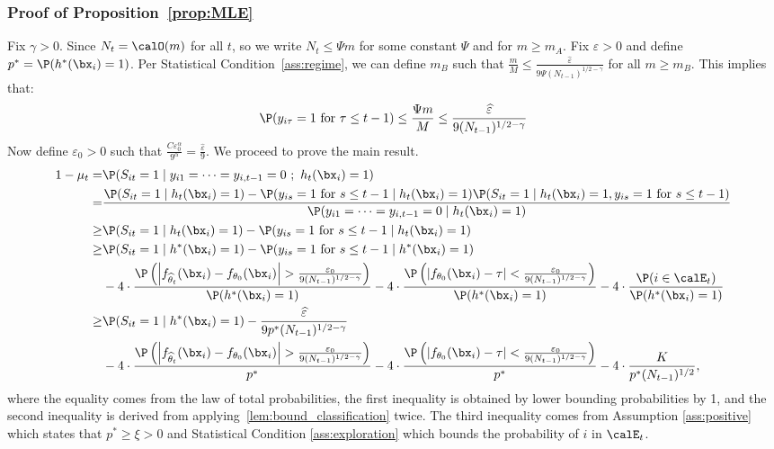\documentclass[blindrev]{informs3noheader}
\begin{document}
\subsubsection*{Proof of Proposition~\ref{prop:MLE}}
Fix $\gamma>0$. Since $N_t=\calO(m)$ for all $t$, so we write $N_t\leq \Psi m$ for some constant $\Psi$ and for $m\geq m_A$. Fix $\widehat\varepsilon>0$ and define $p^*= \P(h^*(\bx_i)=1)$. Per Statistical Condition~\ref{ass:regime}, we can define $m_B$ such that $\frac{m}{M}\leq\frac{\widehat\varepsilon}{9\Psi(N_{t-1})^{1/2-\gamma}}$ for all $m \geq m_B$. This implies that:
\begin{equation}
    \P(y_{i\tau}=1\ \text{for $\tau\leq t-1$})\leq \frac{\Psi m}{M} \leq \frac{\widehat\varepsilon}{9(N_{t-1})^{1/2-\gamma}} \label{eq:regime}
\end{equation}
Now define $\varepsilon_0>0$ such that $\frac{C\varepsilon_0^\alpha}{9^\alpha}=\frac{\widehat\varepsilon}{9}$. We proceed to prove the main result.
\begin{align*}
1-\mu_t=&\P(S_{it}=1 \mid y_{i1}=\cdots=y_{i,t-1}=0\ ;\ h_t(\bx_i)=1)\\
=&\frac{\P(S_{it}=1 \mid h_t(\bx_i)=1)-\P(y_{is}=1\ \text{for $s\leq t-1$} \mid h_t(\bx_i)=1)\P(S_{it}=1 \mid h_t(\bx_i)=1, y_{is}=1\ \text{for $s\leq t-1$})}{\P(y_{i1}=\cdots=y_{i,t-1}=0 \mid h_t(\bx_i)=1)}\\
\geq& \P(S_{it}=1 \mid h_t(\bx_i)=1)-\P(y_{is}=1\ \text{for $s\leq t-1$} \mid h_t(\bx_i)=1)\\
\geq&\P(S_{it}=1 \mid h^*(\bx_i)=1)-\P(y_{is}=1\ \text{for $s\leq t-1$} \mid h^*(\bx_i)=1)\\
&-4\cdot\frac{\P\left( \left|f_{\widehat\theta_t}(\bx_i) - f_{\theta_0}(\bx_i)\right| > \frac{\varepsilon_0}{9(N_{t-1})^{1/2-\gamma}} \right)}{\P(h^*(\bx_i)=1)}- 4\cdot\frac{\P\left( \left|f_{\theta_0}(\bx_i) - \tau\right| < \frac{\varepsilon_0}{9(N_{t-1})^{1/2-\gamma}} \right)}{\P(h^*(\bx_i)=1)}-4\cdot \frac{\P(i \in \calE_t)}{\P(h^*(\bx_i)=1)}\\
\geq&\P(S_{it}=1 \mid h^*(\bx_i)=1)-\frac{\widehat\varepsilon}{9p^*(N_{t-1})^{1/2-\gamma}}\\
&-4\cdot\frac{\P\left( \left|f_{\widehat\theta_t}(\bx_i) - f_{\theta_0}(\bx_i)\right| > \frac{\varepsilon_0}{9(N_{t-1})^{1/2-\gamma}} \right)}{p^*}- 4\cdot\frac{\P\left( \left|f_{\theta_0}(\bx_i) - \tau\right| < \frac{\varepsilon_0}{9(N_{t-1})^{1/2-\gamma}} \right)}{p^*}-4\cdot \frac{K}{p^*(N_{t-1})^{1/2}},       
\end{align*}
where the equality comes from the law of total probabilities, the first inequality is obtained by lower bounding probabilities by 1, and the second inequality is derived from applying~\ref{lem:bound_classification} twice. The third inequality comes from Assumption \ref{ass:positive} which states that $p^*\geq \xi>0$ and Statistical Condition \ref{ass:exploration} which bounds the probability of $i$ in $\calE_t$. 
\end{document}

